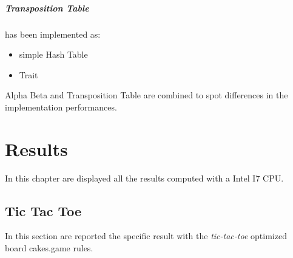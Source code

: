 \documentclass[]{report}
\begin{document}
\paragraph{Transposition Table} has been implemented as:
\begin{itemize}
	\item simple Hash Table
	\item Trait
\end{itemize}

Alpha Beta and Transposition Table are combined to spot differences in the implementation performances.

\chapter{Results}

In this chapter are displayed all the results computed with a Intel I7 CPU.

\section{Tic Tac Toe}
In this section are reported the specific result with the \textit{tic-tac-toe} optimized board cakes.game rules.
\end{document}
